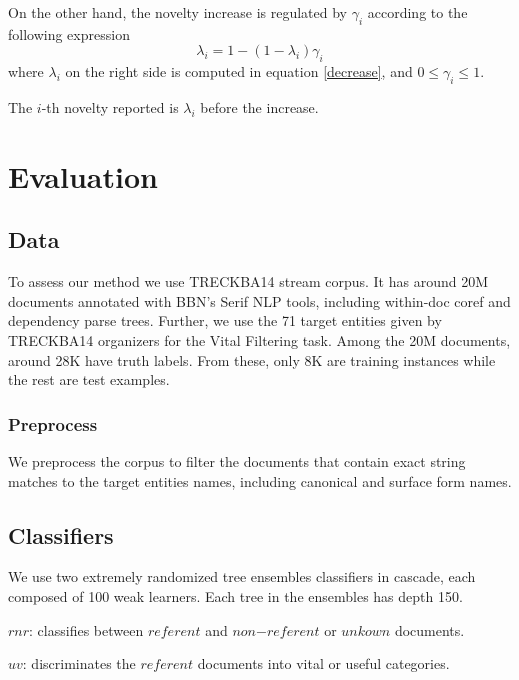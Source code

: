 \documentclass{article}
\begin{document}
On the other hand, the novelty increase is regulated by $\gamma_i$ according to the following expression
\begin{equation}
\lambda_i = 1 - (1 - \lambda_i) \gamma_i
\end{equation}
where $\lambda_i$ on the right side is computed in equation \ref{decrease}, and $0 \leq \gamma_i \leq 1$.

The $i$-th novelty reported is $\lambda_i$ before the increase.


\section{Evaluation}
\label{evaluation}

\subsection{Data}

To assess our method we use TRECKBA14 stream corpus. It has around 20M documents annotated with BBN's Serif NLP tools, including within-doc coref and dependency parse trees. Further, we use the 71 target entities given by TRECKBA14 organizers for the Vital Filtering task. Among the 20M documents, around 28K have truth labels. From these, only 8K are training instances while the rest are test examples.

\subsubsection{Preprocess}

We preprocess the corpus to filter the documents that contain exact string matches to the target entities names, including canonical and surface form names.

\subsection{Classifiers}

We use two extremely randomized tree ensembles classifiers \cite{GEW06a} in cascade, each composed of 100 weak learners. Each tree in the ensembles has depth 150.

\begin{itemize*}
    \item $rnr$: classifies between $referent$ and $non\mathord{-}referent$ or $unkown$ documents.
    \item $uv$: discriminates the $referent$ documents into vital or useful categories.
\end{itemize*}
\end{document}
